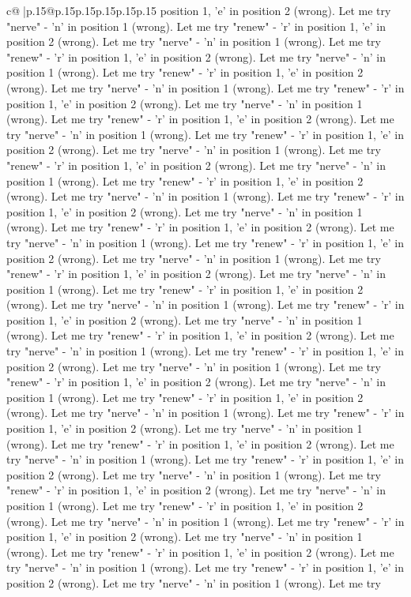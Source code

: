 \documentclass{article}
\begin{document}
{\begin{supertabular}{c@{$\;$}|p{.15\linewidth}@{}p{.15\linewidth}p{.15\linewidth}p{.15\linewidth}p{.15\linewidth}p{.15\linewidth}}
{{{position 1, 'e' in position 2 (wrong). Let me try "nerve" {-} 'n' in position 1 (wrong). Let me try "renew" {-} 'r' in position 1, 'e' in position 2 (wrong). Let me try "nerve" {-} 'n' in position 1 (wrong). Let me try "renew" {-} 'r' in position 1, 'e' in position 2 (wrong). Let me try "nerve" {-} 'n' in position 1 (wrong). Let me try "renew" {-} 'r' in position 1, 'e' in position 2 (wrong). Let me try "nerve" {-} 'n' in position 1 (wrong). Let me try "renew" {-} 'r' in position 1, 'e' in position 2 (wrong). Let me try "nerve" {-} 'n' in position 1 (wrong). Let me try "renew" {-} 'r' in position 1, 'e' in position 2 (wrong). Let me try "nerve" {-} 'n' in position 1 (wrong). Let me try "renew" {-} 'r' in position 1, 'e' in position 2 (wrong). Let me try "nerve" {-} 'n' in position 1 (wrong). Let me try "renew" {-} 'r' in position 1, 'e' in position 2 (wrong). Let me try "nerve" {-} 'n' in position 1 (wrong). Let me try "renew" {-} 'r' in position 1, 'e' in position 2 (wrong). Let me try "nerve" {-} 'n' in position 1 (wrong). Let me try "renew" {-} 'r' in position 1, 'e' in position 2 (wrong). Let me try "nerve" {-} 'n' in position 1 (wrong). Let me try "renew" {-} 'r' in position 1, 'e' in position 2 (wrong). Let me try "nerve" {-} 'n' in position 1 (wrong). Let me try "renew" {-} 'r' in position 1, 'e' in position 2 (wrong). Let me try "nerve" {-} 'n' in position 1 (wrong). Let me try "renew" {-} 'r' in position 1, 'e' in position 2 (wrong). Let me try "nerve" {-} 'n' in position 1 (wrong). Let me try "renew" {-} 'r' in position 1, 'e' in position 2 (wrong). Let me try "nerve" {-} 'n' in position 1 (wrong). Let me try "renew" {-} 'r' in position 1, 'e' in position 2 (wrong). Let me try "nerve" {-} 'n' in position 1 (wrong). Let me try "renew" {-} 'r' in position 1, 'e' in position 2 (wrong). Let me try "nerve" {-} 'n' in position 1 (wrong). Let me try "renew" {-} 'r' in position 1, 'e' in position 2 (wrong). Let me try "nerve" {-} 'n' in position 1 (wrong). Let me try "renew" {-} 'r' in position 1, 'e' in position 2 (wrong). Let me try "nerve" {-} 'n' in position 1 (wrong). Let me try "renew" {-} 'r' in position 1, 'e' in position 2 (wrong). Let me try "nerve" {-} 'n' in position 1 (wrong). Let me try "renew" {-} 'r' in position 1, 'e' in position 2 (wrong). Let me try "nerve" {-} 'n' in position 1 (wrong). Let me try "renew" {-} 'r' in position 1, 'e' in position 2 (wrong). Let me try "nerve" {-} 'n' in position 1 (wrong). Let me try "renew" {-} 'r' in position 1, 'e' in position 2 (wrong). Let me try "nerve" {-} 'n' in position 1 (wrong). Let me try "renew" {-} 'r' in position 1, 'e' in position 2 (wrong). Let me try "nerve" {-} 'n' in position 1 (wrong). Let me try "renew" {-} 'r' in position 1, 'e' in position 2 (wrong). Let me try "nerve" {-} 'n' in position 1 (wrong). Let me try "renew" {-} 'r' in position 1, 'e' in position 2 (wrong). Let me try "nerve" {-} 'n' in position 1 (wrong). Let me try "renew" {-} 'r' in position 1, 'e' in position 2 (wrong). Let me try "nerve" {-} 'n' in position 1 (wrong). Let me try "renew" {-} 'r' in position 1, 'e' in position 2 (wrong). Let me try "nerve" {-} 'n' in position 1 (wrong). Let me try }}}
\end{supertabular}}
\end{document}
